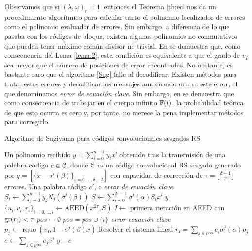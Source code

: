 Observamos que si $(\lambda,\omega)_r = 1$, entonces el Teorema \ref{th:ec} nos da un procedimiento algorítmico para calcular tanto el polinomio localizador de errores como el polinomio evaluador de errores. Sin embargo, a diferencia de lo que pasaba con los códigos de bloque, existen algunos polinomios no conmutativos que pueden tener máximo común divisor no trivial. En \cite{gomez2017sugiyama} se demuestra que, como consecuencia del Lema \ref{lema:2}, esta condición es equivalente a que el grado de $v_I$ sea mayor que el número de posiciones de error encontradas. No obstante, es bastante raro que el algoritmo \ref{Sug} falle al decodificar. Existen métodos para tratar estos errores y decodificar los mensajes aun cuando ocurra este error, al que denominamos \textit{error de ecuación clave}. Sin embargo, en \cite[Th. 19]{gomez2017sugiyama} se demuestra que como consecuencia de trabajar en el cuerpo infinito $\mathbb{F}(t)$, la probabilidad teórica de que esto ocurra es cero y, por tanto, no merece la pena implementar métodos para corregirlo.

\begin{algorithm}[H]
    \caption{Algoritmo de Sugiyama para códigos convolucionales sesgados RS}\label{Sug}
    \begin{algorithmic}[1]
    \REQUIRE Un polinomio recibido $y=\sum_{i=0}^{n-1}y_ix^i$ obtenido tras la transmisión de una palabra código $c \in \mathcal C$, donde $\mathcal C$ es un código convolucional RS sesgado generado por $g=\left[\{x-\sigma^i(\beta)\}_{i=0, \ldots , \delta-2}\right]$ con capacidad de corrección de $\tau=\lfloor \frac{\delta-1}{2}\rfloor$ errores.
    \ENSURE Una palabra código $c'$, o \emph{error de ecuación clave}.
        \STATE $S_i\gets\sum_{j=0}^{n-1} y_jN_j(\sigma^i(\beta))$
    \ENDFOR
    \STATE $S\gets \sum_{i=0}^{2\tau-1} \sigma^i(\alpha)S_ix^i$
        \RETURN $y$
    \ENDIF
    \STATE $\{u_i,v_i,r_i\}_{i=0,\ldots , l}\gets \text{AEED}(x^{2\tau},S)$
    \STATE $I\gets$ primera iteración en AEED con $\operatorname{gr}(r_i)<\tau$
    \STATE $pos\gets \emptyset$
            \STATE $pos=pos  \cup  \{i\}$
        \ENDIF
    \ENDFOR
    \label{kef}
        \RETURN \emph{error ecuación clave}
    \ENDIF
        \STATE $p_j\gets \operatorname{rquo}(v_I,1-\sigma^j(\beta)x)$
    \ENDFOR
    \STATE Resolver el sistema lineal $r_I=\sum_{j\in pos}e_j\sigma^{j}(\alpha) p_j$
    \STATE $e\gets \sum_{j\in pos} e_jx^j$
    \RETURN $y-e$
    \end{algorithmic}
\end{algorithm}


